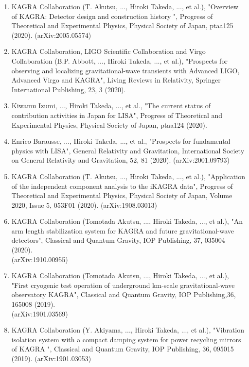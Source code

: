 \documentclass[uplatex, 12pt,a4paper]{jsarticle}
\begin{document}
\begin{enumerate}
\item KAGRA Collaboration (T. Akutsu, ..., Hiroki Takeda, ..., et al.), "Overview of KAGRA: Detector design and construction history ", Progress of Theoretical and Experimental Physics, Physical Society of Japan, ptaa125 (2020). (arXiv:2005.05574)

\item KAGRA Collaboration, LIGO Scientific Collaboration and Virgo Collaboration (B.P. Abbott, ..., Hiroki Takeda, ..., et al.), "Prospects for observing and localizing gravitational-wave transients with Advanced LIGO, Advanced Virgo and KAGRA", Living Reviews in Relativity, Springer International Publishing, 23, 3 (2020).

\item Kiwamu Izumi, ..., Hiroki Takeda, ..., et al., "The current status of contribution activities in Japan for LISA", Progress of Theoretical and Experimental Physics, Physical Society of Japan, ptaa124 (2020).

\item Enrico Barausse, ..., Hiroki Takeda, ..., et al., "Prospects for fundamental physics with LISA", General Relativity and Gravitation, International Society on General Relativity and Gravitation, 52, 81 (2020). (arXiv:2001.09793)

\item KAGRA Collaboration (T. Akutsu, ..., Hiroki Takeda, ..., et al.), "Application of the independent component analysis to the iKAGRA data", Progress of Theoretical and Experimental Physics, Physical Society of Japan, Volume 2020, Issue 5, 053F01 (2020). (arXiv:1908.03013)

\item KAGRA Collaboration (Tomotada Akutsu, ..., Hiroki Takeda, ..., et al.), "An arm length stabilization system for KAGRA and future gravitational-wave detectors", Classical and Quantum Gravity, IOP Publishing, 37, 035004 (2020).\\ (arXiv:1910.00955)

\item KAGRA Collaboration (Tomotada Akutsu, ..., Hiroki Takeda, ..., et al.), "First cryogenic test operation of underground km-scale gravitational-wave observatory KAGRA", Classical and Quantum Gravity, IOP Publishing,36, 165008 (2019).\\ (arXiv:1901.03569)

\item KAGRA Collaboration (Y. Akiyama, ..., Hiroki Takeda, ..., et al.), "Vibration isolation system with a compact damping system for power recycling mirrors of KAGRA ", Classical and Quantum Gravity, IOP Publishing, 36, 095015 (2019). (arXiv:1901.03053)


\end{enumerate}
\end{document}
